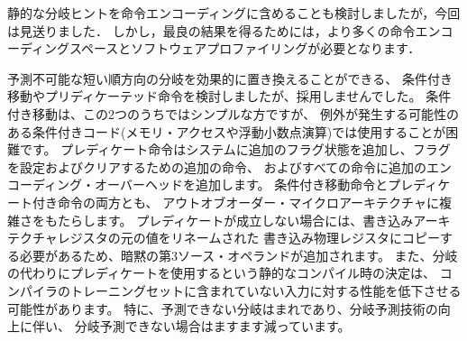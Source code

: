 \begin{commentary}
静的な分岐ヒントを命令エンコーディングに含めることも検討しましたが，今回は見送りました． 
しかし，最良の結果を得るためには，より多くの命令エンコーディングスペースとソフトウェアプロファイリングが必要となります．

\begin{comment}
We considered but did not include conditional moves or predicated
instructions, which can effectively replace unpredictable short
forward branches.  Conditional moves are the simpler of the two, but
are difficult to use with conditional code that might cause exceptions
(memory accesses and floating-point operations).  Predication adds
additional flag state to a system, additional instructions to set and
clear flags, and additional encoding overhead on every instruction.
Both conditional move and predicated instructions add complexity to
out-of-order microarchitectures, adding an implicit third source
operand due to the need to copy the original value of the destination
architectural register into the renamed destination physical register
if the predicate is false.  Also, static compile-time decisions to use
predication instead of branches can result in lower performance on
inputs not included in the compiler training set, especially given
that unpredictable branches are rare, and becoming rarer as branch
prediction techniques improve.
\end{comment}

予測不可能な短い順方向の分岐を効果的に置き換えることができる、
条件付き移動やプリディケーテッド命令を検討しましたが、採用しませんでした。 
条件付き移動は、この2つのうちではシンプルな方ですが、
例外が発生する可能性のある条件付きコード(メモリ・アクセスや浮動小数点演算)では使用することが困難です。 
プレディケート命令はシステムに追加のフラグ状態を追加し、フラグを設定およびクリアするための追加の命令、
およびすべての命令に追加のエンコーディング・オーバーヘッドを追加します。
条件付き移動命令とプレディケート付き命令の両方とも、
アウトオブオーダー・マイクロアーキテクチャに複雑さをもたらします。
プレディケートが成立しない場合には、書き込みアーキテクチャレジスタの元の値をリネームされた
書き込み物理レジスタにコピーする必要があるため、暗黙の第3ソース・オペランドが追加されます。 
また、分岐の代わりにプレディケートを使用するという静的なコンパイル時の決定は、
コンパイラのトレーニングセットに含まれていない入力に対する性能を低下させる可能性があります。
特に、予測できない分岐はまれであり、分岐予測技術の向上に伴い、
分岐予測できない場合はますます減っています。


\end{commentary}
